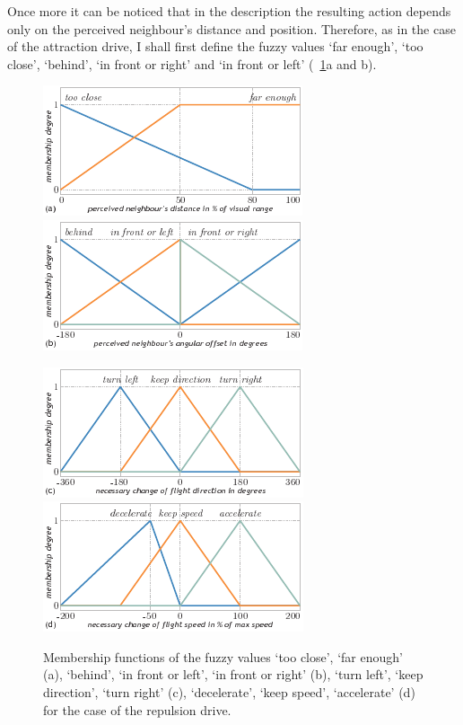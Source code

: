Once more it can be noticed that in the description the resulting action depends only on the perceived neighbour's distance and position. Therefore, as in the case of the attraction drive, I shall first define the fuzzy values `far enough', `too close', `behind', `in front or right' and `in front or left' (\figs~\ref{fig:fuzzyAnimat:Dr:afd}a and b). 
%
\begin{figure}%
\null\vspace*{2mm}\par
\includegraphics{fig[repulsion]a}\hspace*{2mm}\includegraphics{fig[repulsion]b}
\par\vspace*{2mm}
\includegraphics{fig[repulsion]c}\hspace*{2mm}\includegraphics{fig[repulsion]d}
\par\vspace*{2mm}
\caption{Membership functions of the fuzzy values `too close', `far enough' (a), `behind', `in front or left', `in front or right' (b), `turn left', `keep direction', `turn right' (c), `decelerate', `keep speed', `accelerate' (d) for the case of the repulsion drive.}
\label{fig:fuzzyAnimat:Dr:afd}
\end{figure}
